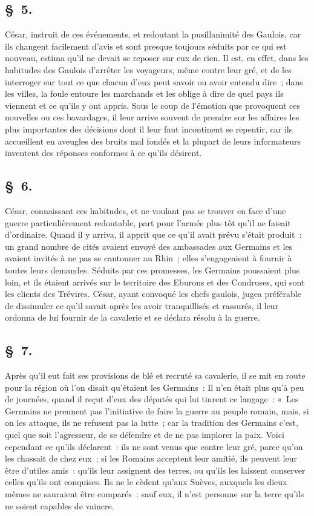\documentclass[french,twoside]{book} %
\begin{document}
\subsection[{§ 5.}]{ \textsc{§ 5.} }
\noindent César, instruit de ces événements, et redoutant la pusillanimité des Gaulois, car ils changent facilement d’avis et sont presque toujours séduits par ce qui est nouveau, estima qu’il ne devait se reposer sur eux de rien. Il est, en effet, dans les habitudes des Gaulois d’arrêter les voyageurs, même contre leur gré, et de les interroger sur tout ce que chacun d’eux peut savoir ou avoir entendu dire ; dans les villes, la foule entoure les marchands et les oblige à dire de quel pays ils viennent et ce qu’ils y ont appris. Sous le coup de l’émotion que provoquent ces nouvelles ou ces bavardages, il leur arrive souvent de prendre sur les affaires les plus importantes des décisions dont il leur faut incontinent se repentir, car ils accueillent en aveugles des bruits mal fondés et la plupart de leurs informateurs inventent des réponses conformes à ce qu’ils désirent.
\subsection[{§ 6.}]{ \textsc{§ 6.} }
\noindent César, connaissant ces habitudes, et ne voulant pas se trouver en face d’une guerre particulièrement redoutable, part pour l’armée plus tôt qu’il ne faisait d’ordinaire. Quand il y arriva, il apprit que ce qu’il avait prévu s’était produit : un grand nombre de cités avaient envoyé des ambassades aux Germains et les avaient invités à ne pas se cantonner au Rhin ; elles s’engageaient à fournir à toutes leurs demandes. Séduits par ces promesses, les Germains poussaient plus loin, et ils étaient arrivés sur le territoire des Eburons et des Condruses, qui sont les clients des Trévires. César, ayant convoqué les chefs gaulois, jugea préférable de dissimuler ce qu’il savait après les avoir tranquillisés et rassurés, il leur ordonna de lui fournir de la cavalerie et se déclara résolu à la guerre.
\subsection[{§ 7.}]{ \textsc{§ 7.} }
\noindent Après qu’il eut fait ses provisions de blé et recruté sa cavalerie, il se mit en route pour la région où l’on disait qu’étaient les Germains : Il n’en était plus qu’à peu de journées, quand il reçut d’eux des députés qui lui tinrent ce langage : « Les Germains ne prennent pas l’initiative de faire la guerre au peuple romain, mais, si on les attaque, ils ne refusent pas la lutte ; car la tradition des Germains c’est, quel que soit l’agresseur, de se défendre et de ne pas implorer la paix. Voici cependant ce qu’ils déclarent : ils ne sont venus que contre leur gré, parce qu’on les chassait de chez eux ; si les Romains acceptent leur amitié, ils peuvent leur être d’utiles amis : qu’ils leur assignent des terres, ou qu’ils les laissent conserver celles qu’ils ont conquises. Ils ne le cèdent qu’aux Suèves, auxquels les dieux mêmes ne sauraient être comparés : sauf eux, il n’est personne sur la terre qu’ils ne soient capables de vaincre.
\end{document}
